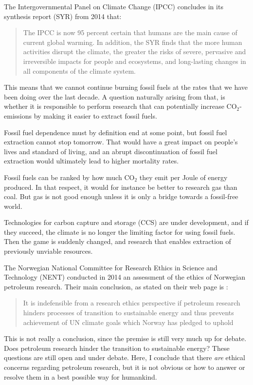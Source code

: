 The Intergovernmental Panel on Climate Change (IPCC) concludes in its synthesis report (SYR) from 2014 \cite{IPCC2014} that:

\begin{quotation}
The IPCC is now 95 percent certain that humans are the main cause of current global warming. In addition, the SYR finds that the more human activities disrupt the climate, the greater the risks of severe, pervasive and irreversible impacts for people and ecosystems, and long-lasting changes in all components of the climate system. 
\end{quotation}
This means that we cannot continue burning fossil fuels at the rates that we have been doing over the last decade. A question naturally arising from that, is whether it is responsible to perform research that can potentially increase CO$_2$-emissions by making it easier to extract fossil fuels.

Fossil fuel dependence must by definition end at some point, but fossil fuel extraction cannot stop tomorrow. That would have a great impact on people's lives and standard of living, and an abrupt discontinuation of fossil fuel extraction would ultimately lead to higher mortality rates.

Fossil fuels can be ranked by how much CO$_2$ they emit per Joule of energy produced. In that respect, it would for instance be better to research gas than coal. But gas is not good enough unless it is only a bridge towards a fossil-free world.

Technologies for carbon capture and storage (CCS) are under development, and if they succeed, the climate is no longer the limiting factor for using fossil fuels. Then the game is suddenly changed, and research that enables extraction of previously unviable resources.

The Norwegian National Committee for Research Ethics in Science and Technology (NENT) conducted in 2014 an assessment of the ethics of Norwegian petroleum research. Their main conclusion, as stated on their web page is \cite{NENT2014}:

\begin{quotation}
It is indefensible from a research ethics perspective if petroleum research hinders processes of transition to sustainable energy and thus prevents achievement of UN climate goals which Norway has pledged to uphold
\end{quotation}
This is not really a conclusion, since the premise is still very much up for debate. Does petroleum research hinder the transition to sustainable energy? These questions are still open and under debate. 
Here, I conclude that there \emph{are} ethical concerns regarding petroleum research, but it is not obvious or how to answer or resolve them in a best possible way for humankind.

